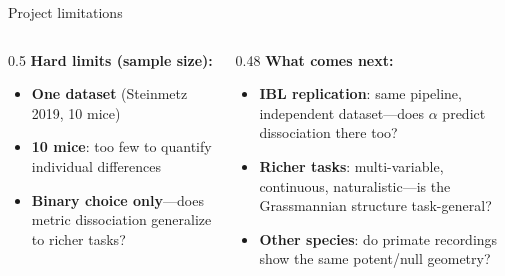 \documentclass[aspectratio=169,11pt]{beamer}
\begin{document}
\begin{frame}{Project limitations}
\begin{columns}[T]
\begin{column}{0.5\textwidth}
\textbf{Hard limits (sample size):}
\begin{itemize}
  \item \textbf{One dataset} (Steinmetz 2019, 10 mice)
  \item \textbf{10 mice}: too few to quantify individual differences
  \item \textbf{Binary choice only}---does metric dissociation generalize to richer tasks?
\end{itemize}
\end{column}
\begin{column}{0.48\textwidth}
\textbf{What comes next:}
\begin{itemize}
  \item \textbf{IBL replication}: same pipeline, independent dataset---does $\alpha$ predict dissociation there too?
  \item \textbf{Richer tasks}: multi-variable, continuous, naturalistic---is the Grassmannian structure task-general?
  \item \textbf{Other species}: do primate recordings show the same potent/null geometry?
\end{itemize}
\end{column}
\end{columns}
\end{frame}
\end{document}
